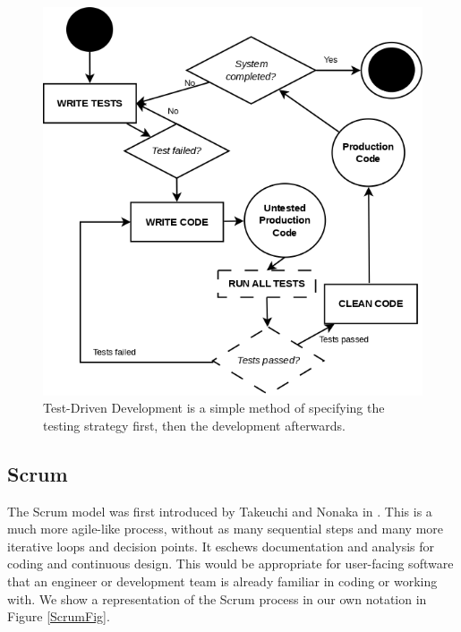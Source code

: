 \begin{figure}
	\centering
	\includegraphics[scale=0.35]{media/TDD}
	\caption{Test-Driven Development is a simple method of specifying the testing strategy first, then
		the development afterwards.}
	\label{TDD}
\end{figure}

\subsection{Scrum}
The Scrum model was first introduced by Takeuchi and Nonaka in \cite{takeuchi1986new}.
This is a much more agile-like process, without as many sequential steps and many more iterative
loops and decision points.
It eschews documentation and analysis for coding and continuous design.
This would be appropriate for user-facing software that an engineer or development team is already
familiar in coding or working with.
We show a representation of the Scrum process in our own notation in Figure \ref{ScrumFig}.

